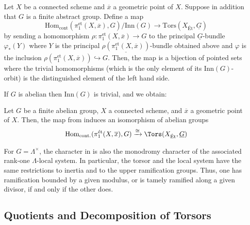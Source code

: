 \begin{theorem}\label{theorem:equivalence_fundamental_covers}
    Let $X$ be a connected scheme and $\overline{x}$ a geometric point of $X$. Suppose in addition that $G$ is a finite abstract group. 
    Define a map
    \begin{equation}
        \mathrm{Hom}_{\mathrm{cont}}(\pi_1^{\mathrm{et}}(X, \overline{x}), G) / \mathrm{Inn}(G) \to \mathrm{Tors}(X_{\text{\'Et}}, \underline{G}) 
    \end{equation}
by sending a homomorphism $\rho : \pi_1^{\mathrm{et}}(X, \overline{x}) \to G$ 
to the principal $\underline{G}$-bundle $\varphi_*(Y)$ where $Y$ is the principal $\underline{\rho(\pi_1^{\mathrm{et}}(X, \overline{x}))}$-bundle 
obtained above and $\varphi$ is the inclusion $\rho(\pi_1^{\mathrm{et}}(X, \overline{x})) \hookrightarrow G$. Then, the map 
 is a bijection of pointed sets where the trivial homomorphisms
  (which is the only element of its $\mathrm{Inn}(G)$-orbit) is the distinguished element of the left hand side.
\end{theorem}

If $G$ is abelian then $\mathrm{Inn}(G)$ is trivial, and we obtain:
\begin{cor}\label{cor:abelian_equivilance_fundamental_torsors}
    Let $G$ be a finite abelian group, $X$ a connected scheme, and $\overline{x}$ a geometric point of $X$. Then, the map from 
     induces an isomorphism of abelian groups
    \begin{equation}
        \mathrm{Hom}_{\mathrm{cont.}}(\pi_1^{\text{ét}}(X, \overline{x}), G) \xrightarrow{\cong} \Tors(X_{\text{\'Et}}, \underline{G})
    \end{equation}
\end{cor}

For $G=\Lambda^\times$, the character in
 is also the monodromy
character of the associated rank-one $\Lambda$-local system. In particular,
the torsor and the local system have the same restrictions to inertia and to
the upper ramification groups. Thus, one has ramification bounded by a given
modulus, or is tamely ramified along a given divisor, if and only if the other
does.

\subsection*{Quotients and Decomposition of Torsors}

